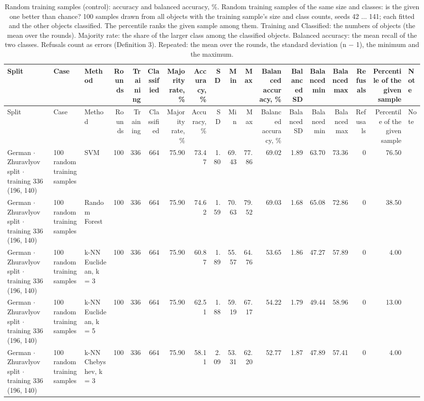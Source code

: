 \begin{longtable}{lllrrrrrrrrrrrrrrl}
  \caption{Random training samples (control): accuracy and balanced accuracy, \%. Random training samples of the same size and classes: is the given one better than chance? 100 samples drawn from all objects with the training sample's size and class counts, seeds 42 $\ldots$ 141; each fitted and the other objects classified. The percentile ranks the given sample among them. Training and Classified: the numbers of objects (the mean over the rounds). Majority rate: the share of the larger class among the classified objects. Balanced accuracy: the mean recall of the two classes. Refusals count as errors (Definition 3). Repeated: the mean over the rounds, the standard deviation (n $-$ 1), the minimum and the maximum.}\label{tab:random-control} \\
  \toprule
  Split & Case & Method & Rounds & Training & Classified & Majority rate, \% & Accuracy, \% & SD & Min & Max & Balanced accuracy, \% & Balanced SD & Balanced min & Balanced max & Refusals & Percentile of the given sample & Note \\
  \midrule
  \endfirsthead
  \toprule
  Split & Case & Method & Rounds & Training & Classified & Majority rate, \% & Accuracy, \% & SD & Min & Max & Balanced accuracy, \% & Balanced SD & Balanced min & Balanced max & Refusals & Percentile of the given sample & Note \\
  \midrule
  \endhead
  \bottomrule
  \endfoot
  German $\cdot$ Zhuravlyov split $\cdot$ training 336 (196, 140) & 100 random training samples & SVM & 100 & 336 & 664 & 75.90 & 73.47 & 1.80 & 69.43 & 77.86 & 69.02 & 1.89 & 63.70 & 73.36 & 0 & 76.50 &  \\
  German $\cdot$ Zhuravlyov split $\cdot$ training 336 (196, 140) & 100 random training samples & Random Forest & 100 & 336 & 664 & 75.90 & 74.62 & 1.59 & 70.63 & 79.52 & 69.03 & 1.68 & 65.08 & 72.86 & 0 & 38.50 &  \\
  German $\cdot$ Zhuravlyov split $\cdot$ training 336 (196, 140) & 100 random training samples & k-NN Euclidean, k = 3 & 100 & 336 & 664 & 75.90 & 60.87 & 1.89 & 55.57 & 64.76 & 53.65 & 1.86 & 47.27 & 57.89 & 0 & 4.00 &  \\
  German $\cdot$ Zhuravlyov split $\cdot$ training 336 (196, 140) & 100 random training samples & k-NN Euclidean, k = 5 & 100 & 336 & 664 & 75.90 & 62.51 & 1.88 & 59.19 & 67.17 & 54.22 & 1.79 & 49.44 & 58.96 & 0 & 13.00 &  \\
  German $\cdot$ Zhuravlyov split $\cdot$ training 336 (196, 140) & 100 random training samples & k-NN Chebyshev, k = 3 & 100 & 336 & 664 & 75.90 & 58.11 & 2.09 & 53.31 & 62.20 & 52.77 & 1.87 & 47.89 & 57.41 & 0 & 4.00 &  \\

\end{longtable}
